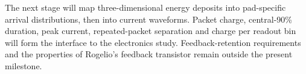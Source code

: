\documentclass[11pt,a4paper]{article}
\begin{document}
The next stage will map three-dimensional energy deposits into pad-specific
arrival distributions, then into current waveforms. Packet charge, central-90\%
duration, peak current, repeated-packet separation and charge per readout bin
will form the interface to the electronics study. Feedback-retention
requirements and the properties of Rogelio's feedback transistor remain outside
the present milestone.



\end{document}
